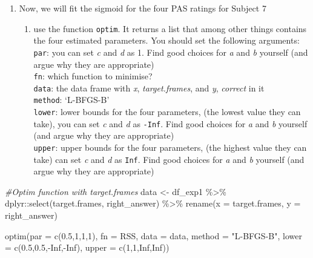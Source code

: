 \documentclass[
]{article}
\newenvironment{Shaded}{\begin{snugshade}}{\end{snugshade}}
\newcommand{\AttributeTok}[1]{\textcolor[rgb]{0.77,0.63,0.00}{#1}}
\newcommand{\CommentTok}[1]{\textcolor[rgb]{0.56,0.35,0.01}{\textit{#1}}}
\newcommand{\ConstantTok}[1]{\textcolor[rgb]{0.00,0.00,0.00}{#1}}
\newcommand{\DecValTok}[1]{\textcolor[rgb]{0.00,0.00,0.81}{#1}}
\newcommand{\FloatTok}[1]{\textcolor[rgb]{0.00,0.00,0.81}{#1}}
\newcommand{\FunctionTok}[1]{\textcolor[rgb]{0.00,0.00,0.00}{#1}}
\newcommand{\NormalTok}[1]{#1}
\newcommand{\OtherTok}[1]{\textcolor[rgb]{0.56,0.35,0.01}{#1}}
\newcommand{\SpecialCharTok}[1]{\textcolor[rgb]{0.00,0.00,0.00}{#1}}
\newcommand{\StringTok}[1]{\textcolor[rgb]{0.31,0.60,0.02}{#1}}
\providecommand{\tightlist}{%
  \setlength{\itemsep}{0pt}\setlength{\parskip}{0pt}}
\begin{document}
\begin{enumerate}
\def\labelenumi{\arabic{enumi})}
\tightlist
\item
  Now, we will fit the sigmoid for the four PAS ratings for Subject 7

  \begin{enumerate}
  \def\labelenumii{\roman{enumii}.}
  \tightlist
  \item
    use the function \texttt{optim}. It returns a list that among other
    things contains the four estimated parameters. You should set the
    following arguments:\\
    \texttt{par}: you can set \emph{c} and \emph{d} as 1. Find good
    choices for \emph{a} and \emph{b} yourself (and argue why they are
    appropriate)\\
    \texttt{fn}: which function to minimise?\\
    \texttt{data}: the data frame with \emph{x}, \emph{target.frames},
    and \emph{y}, \emph{correct} in it\\
    \texttt{method}: `L-BFGS-B'\\
    \texttt{lower}: lower bounds for the four parameters, (the lowest
    value they can take), you can set \emph{c} and \emph{d} as
    \texttt{-Inf}. Find good choices for \emph{a} and \emph{b} yourself
    (and argue why they are appropriate)\\
    \texttt{upper}: upper bounds for the four parameters, (the highest
    value they can take) can set \emph{c} and \emph{d} as \texttt{Inf}.
    Find good choices for \emph{a} and \emph{b} yourself (and argue why
    they are appropriate)
  \end{enumerate}
\end{enumerate}

\begin{Shaded}
\begin{Highlighting}[]
\CommentTok{\#Optim function with target.frames}
\NormalTok{data }\OtherTok{\textless{}{-}}\NormalTok{ df\_exp1 }\SpecialCharTok{\%\textgreater{}\%}
\NormalTok{  dplyr}\SpecialCharTok{::}\FunctionTok{select}\NormalTok{(target.frames, right\_answer) }\SpecialCharTok{\%\textgreater{}\%} 
  \FunctionTok{rename}\NormalTok{(}\AttributeTok{x =}\NormalTok{ target.frames, }\AttributeTok{y =}\NormalTok{ right\_answer)}


\FunctionTok{optim}\NormalTok{(}\AttributeTok{par =} \FunctionTok{c}\NormalTok{(}\FloatTok{0.5}\NormalTok{,}\DecValTok{1}\NormalTok{,}\DecValTok{1}\NormalTok{,}\DecValTok{1}\NormalTok{), }\AttributeTok{fn =}\NormalTok{ RSS, }\AttributeTok{data =}\NormalTok{ data, }\AttributeTok{method =} \StringTok{"L{-}BFGS{-}B"}\NormalTok{, }\AttributeTok{lower =} \FunctionTok{c}\NormalTok{(}\FloatTok{0.5}\NormalTok{,}\FloatTok{0.5}\NormalTok{,}\SpecialCharTok{{-}}\ConstantTok{Inf}\NormalTok{,}\SpecialCharTok{{-}}\ConstantTok{Inf}\NormalTok{),}
      \AttributeTok{upper =} \FunctionTok{c}\NormalTok{(}\DecValTok{1}\NormalTok{,}\DecValTok{1}\NormalTok{,}\ConstantTok{Inf}\NormalTok{,}\ConstantTok{Inf}\NormalTok{))}
\end{Highlighting}
\end{Shaded}
\end{document}
